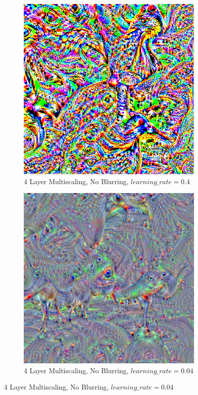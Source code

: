 \begin{figure}
    \captionsetup{justification=centering}

    \begin{subfigure}[t]{0.31\textwidth}
        \captionsetup{justification=centering}
        \centering
        \includegraphics[width=.7\linewidth]{figuras/feat_vis/experiments/final/l12/random_image_pl4_lr4e-1_layer26_no-blur.png}
        \caption{4 Layer Multiscaling, No Blurring, \(learning\_rate = 0.4\)}
    \end{subfigure}
    \hfill
    \begin{subfigure}[t]{0.31\textwidth}
        \captionsetup{justification=centering}
        \centering
        \includegraphics[width=.7\linewidth]{figuras/feat_vis/experiments/final/l12/random_image_pl4_lr4e-2_layer26_no-blur.png}
        \caption{4 Layer Multiscaling, No Blurring, \(learning\_rate = 0.04\)}

\end{subfigure}
\end{figure}
